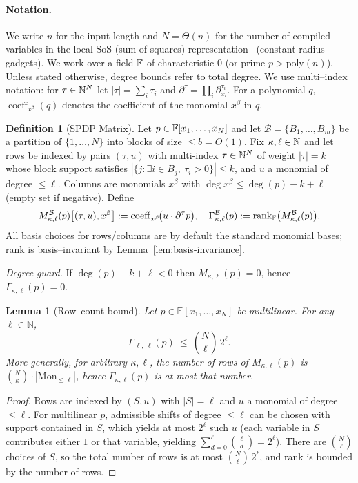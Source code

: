 \documentclass[12pt]{article}
\DeclareMathOperator{\coeff}{coeff}
\newtheorem{lemma}[theorem]{Lemma}
\theoremstyle{definition}
\newtheorem{definition}{Definition}
\theoremstyle{definition}
\theoremstyle{remark}
\theoremstyle{remark}
\begin{document}
\paragraph{Notation.}
We write $n$ for the input length and $N{=}\Theta(n)$ for the number of compiled variables in the local SoS (sum-of-squares) representation~\cite{parrilo2000,lasserre2001} (constant-radius gadgets). We work over a field $\Bbb F$ of characteristic $0$ (or prime $p>\mathrm{poly}(n)$). Unless stated otherwise, degree bounds refer to total degree.
We use multi--index notation: for $\tau\in\Bbb N^N$ let $|\tau|=\sum_i \tau_i$ and $\partial^\tau=\prod_i \partial_{x_i}^{\tau_i}$.
For a polynomial $q$, $\coeff_{x^{\beta}}(q)$ denotes the coefficient of the monomial $x^\beta$ in $q$.

\begin{definition}[SPDP Matrix]
\label{def:spdp}
Let $p\in\Bbb F[x_1,\ldots,x_N]$ and let $\mathcal B=\{B_1,\ldots,B_m\}$ be a partition of $\{1,\ldots,N\}$ into blocks of size $\le b=O(1)$.
Fix $\kappa,\ell\in\Bbb N$ and let rows be indexed by pairs $(\tau,u)$ with multi-index $\tau\in\Bbb N^N$ of weight $|\tau|=k$ whose block support satisfies $|\{j:\exists i\in B_j,\ \tau_i>0\}|\le k$, and $u$ a monomial of degree $\le \ell$.
Columns are monomials $x^\beta$ with $\deg x^\beta \le \deg(p)-k+\ell$ (empty set if negative).
Define
\[
M^{\mathcal B}_{\kappa,\ell}(p)\big[(\tau,u),x^\beta\big]
:= \mathrm{coeff}_{x^\beta}\!\big(u\cdot \partial^\tau p\big),
\quad
\Gamma^{\mathcal B}_{\kappa,\ell}(p):=\mathrm{rank}_\Bbb F\big(M^{\mathcal B}_{\kappa,\ell}(p)\big).
\]
All basis choices for rows/columns are by default the standard monomial bases; rank is basis--invariant by Lemma~\ref{lem:basis-invariance}.
\end{definition}

\noindent\emph{Degree guard.} If $\deg(p)-k+\ell<0$ then $M_{\kappa,\ell}(p)=0$, hence $\Gamma_{\kappa,\ell}(p)=0$.

\begin{lemma}[Row--count bound]\label{lem:rank-equivalence}\label{lem:rowcount}
Let $p\in\mathbb{F}[x_1,\dots,x_N]$ be multilinear. For any $\ell\in\mathbb{N}$,
\[
\Gamma_{\,\ell,\ \ell}(p)\ \le\ \binom{N}{\ell}\,2^{\ell}.
\]
More generally, for arbitrary $\kappa,\ell$, the number of rows of $M_{\kappa,\ell}(p)$ is $\binom{N}{\kappa}\cdot |\mathrm{Mon}_{\le \ell}|$, hence $\Gamma_{\kappa,\ell}(p)$ is at most that number.
\end{lemma}

\begin{proof}
Rows are indexed by $(S,u)$ with $|S|=\ell$ and $u$ a monomial of degree $\le \ell$. For multilinear $p$, admissible shifts of degree $\le \ell$ can be chosen with support contained in $S$, which yields at most $2^\ell$ such $u$ (each variable in $S$ contributes either $1$ or that variable, yielding $\sum_{d=0}^{\ell}\binom{\ell}{d}=2^\ell$). There are $\binom{N}{\ell}$ choices of $S$, so the total number of rows is at most $\binom{N}{\ell}\,2^\ell$, and rank is bounded by the number of rows.
\end{proof}
\end{document}
